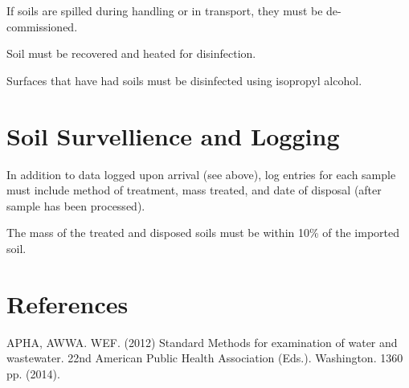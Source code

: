 \documentclass[12pt]{../SOP3}\usepackage[]{graphicx}\usepackage[]{color}
\begin{document}
\NP If soils are spilled during handling or in transport, they must be de-commissioned. 

\NP Soil must be recovered and heated for disinfection. 

\NP Surfaces that have had soils must be disinfected using isopropyl alcohol. 

\section{Soil Survellience and Logging}

\NP In addition to data logged upon arrival (see above), log entries for each sample must include method of treatment, mass treated, and date of disposal (after sample has been processed).

\NP The mass of the treated and disposed soils must be within 10\% of the imported soil.


\section{References}

\NP APHA, AWWA. WEF. (2012) Standard Methods for examination of water and wastewater. 22nd American Public Health Association (Eds.). Washington. 1360 pp. (2014).
\end{document}

